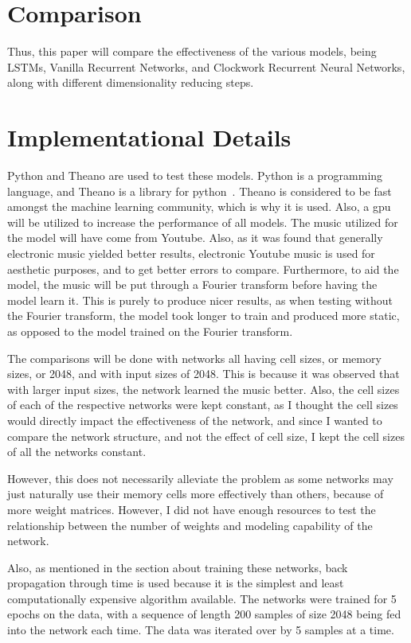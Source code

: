 \documentclass[12pt]{article}
\begin{document}
\section{Comparison}
Thus, this paper will compare the effectiveness of the various models, being
LSTMs, Vanilla Recurrent Networks, and Clockwork Recurrent Neural Networks,
along with different dimensionality reducing steps.


\section{Implementational Details}
Python and Theano are used to test these models. Python is a programming
language, and Theano is a library for python~\cite{theano}. Theano is considered to be
fast amongst the machine learning community, which is why it is used. Also, a
gpu will be utilized to increase the performance of all models. The music
utilized for the model will have come from Youtube. Also, as it was found that
generally electronic music yielded better results, electronic Youtube music is
used for aesthetic purposes, and to get better errors to compare. Furthermore,
to aid the model, the music will be put through a Fourier transform before
having the model learn it. This is purely to produce nicer results, as when
testing without the Fourier transform, the model took longer to train and
produced more static, as opposed to the model trained on the Fourier transform.

The comparisons will be done with networks all having cell sizes, or memory
sizes, or 2048, and with input sizes of 2048. This is because it was observed
that with larger input sizes, the network learned the music better. Also, the
cell sizes of each of the respective networks were kept constant, as I thought
the cell sizes would directly impact the effectiveness of the network, and since
I wanted to compare the network structure, and not the effect of cell size, I
kept the cell sizes of all the networks constant.

However, this does not necessarily alleviate the problem as some networks may
just naturally use their memory cells more effectively than others, because of
more weight matrices. However, I did not have enough resources to test the
relationship between the number of weights and modeling capability of the
network.

Also, as mentioned in the section about training these networks, back
propagation through time is used because it is the simplest and least
computationally expensive algorithm available. The networks were trained for 5
epochs on the data, with a sequence of length 200 samples of size 2048 being fed
into the network each time. The data was iterated over by 5 samples at a time.
\end{document}
